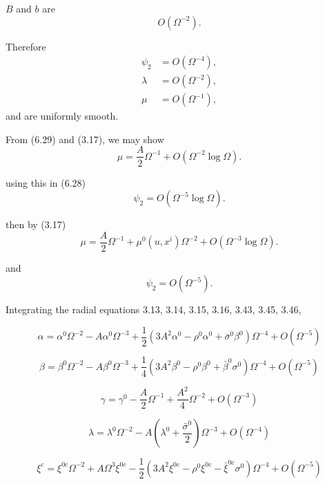 $B$ and $b$ are
\[
O(\Omega^{-2}).
\]

Therefore
\begin{equation}
\begin{aligned}
\psi_2 &= O(\Omega^{-4}),\\
\lambda &= O(\Omega^{-2}),\\
\mu &= O(\Omega^{-1}),
\end{aligned}
\tag{6.29}
\end{equation}
and are uniformly smooth.

From (6.29) and (3.17), we may show
\[
\mu
=
\frac{A}{2}\Omega^{-1}
+
O(\Omega^{-2}\log\Omega).
\]

using this in (6.28)
\[
\psi_2
=
O(\Omega^{-5}\log\Omega).
\]

then by (3.17)
\begin{equation}
\mu
=
\frac{A}{2}\Omega^{-1}
+
\mu^0(u,x^i)\Omega^{-2}
+
O(\Omega^{-3}\log\Omega).
\tag{6.30}
\end{equation}

and
\[
\psi_2 = O(\Omega^{-5}).
\]


Integrating the radial equations 3.13, 3.14, 3.15, 3.16,
3.43, 3.45, 3.46,

\begin{equation}
\alpha
=
\alpha^{0}\Omega^{-2}
-
A\alpha^{0}\Omega^{-3}
+
\frac{1}{2}
\left(
3A^{2}\alpha^{0}
-
\rho^{0}\alpha^{0}
+
\bar{\sigma}^{0}\beta^{0}
\right)\Omega^{-4}
+
O(\Omega^{-5})
\tag{6.31}
\end{equation}

\begin{equation}
\beta
=
\beta^{0}\Omega^{-2}
-
A\beta^{0}\Omega^{-3}
+
\frac{1}{4}
\left(
3A^{2}\beta^{0}
-
\rho^{0}\beta^{0}
+
\bar{\beta}^{0}\sigma^{0}
\right)\Omega^{-4}
+
O(\Omega^{-5})
\tag{6.32}
\end{equation}

\begin{equation}
\gamma
=
\gamma^{0}
-
\frac{A}{2}\Omega^{-1}
+
\frac{A^{2}}{4}\Omega^{-2}
+
O(\Omega^{-3})
\tag{6.33}
\end{equation}

\begin{equation}
\lambda
=
\lambda^{0}\Omega^{-2}
-
A\left(
\lambda^{0}
+
\frac{\bar{\sigma}^{0}}{2}
\right)\Omega^{-3}
+
O(\Omega^{-4})
\tag{6.34}
\end{equation}

\begin{equation}
\xi^{c}
=
\xi^{0c}\Omega^{-2}
+
A\Omega^{3}\xi^{0c}
-
\frac{1}{2}
\left(
3A^{2}\xi^{0c}
-
\rho^{0}\xi^{0c}
-
\bar{\xi}^{0c}\sigma^{0}
\right)\Omega^{-4}
+
O(\Omega^{-5})
\tag{6.35}
\end{equation}

